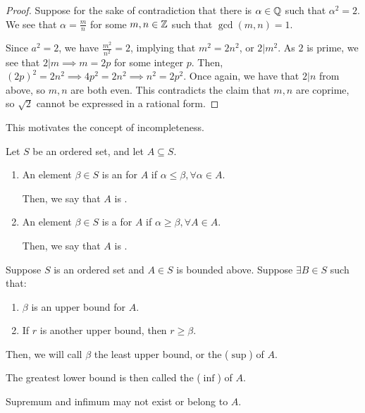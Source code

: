 \documentclass{book}
\begin{document}
\begin{proof}
    Suppose for the sake of contradiction that there is $\alpha \in \mathbb{Q}$ such that $\alpha^2 = 2$. We see that $\alpha = \frac{m}{n}$ for some $m, n \in \mathbb{Z}$ such that $\gcd(m, n) = 1$.

    Since $a^2 = 2$, we have $\frac{m^2}{n^2} = 2$, implying that $m^2 = 2n^2$, or $2 | m^2$. As $2$ is prime, we see that $2 | m \implies m = 2p$ for some integer $p$. Then, $(2p)^2 = 2n^2 \implies 4p^2 = 2n^2 \implies n^2 = 2p^2$. Once again, we have that $2 | n$ from above, so $m, n$ are both even. This contradicts the claim that $m, n$ are coprime, so $\sqrt 2$ cannot be expressed in a rational form. 
\end{proof}

This motivates the concept of incompleteness.

\begin{defn}[Incompleteness]
    Let $S$ be an ordered set, and let $A \subseteq S$. 
    \begin{enumerate}
        \item An element $\beta \in S$ is an  for $A$ if $\alpha \leq \beta, \forall \alpha \in A$. 

        Then, we say that $A$ is .
        \item An element $\beta \in S$ is a  for $A$ if $\alpha \geq \beta, \forall A \in A$. 
        
        Then, we say that $A$ is .
    \end{enumerate}
\end{defn}

\begin{defn}[Supremum]
    Suppose $S$ is an ordered set and $A \in S$ is bounded above. Suppose $\exists B \in S$ such that:
    \begin{enumerate}
        \item $\beta$ is an upper bound for $A$.
        \item If $r$ is another upper bound, then $r \geq \beta$.
    \end{enumerate}
    Then, we will call $\beta$ the least upper bound, or the  ($\sup$) of $A$.
\end{defn}

The greatest lower bound is then called the  ($\inf$) of $A$.

\begin{remark}
    Supremum and infimum may not exist or belong to $A$.
\end{remark}
\end{document}
